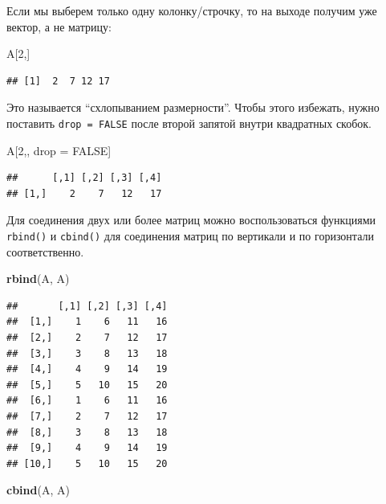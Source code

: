 \documentclass[
]{book}
\newenvironment{Shaded}{\begin{snugshade}}{\end{snugshade}}
\newcommand{\DecValTok}[1]{\textcolor[rgb]{0.00,0.00,0.81}{#1}}
\newcommand{\KeywordTok}[1]{\textcolor[rgb]{0.13,0.29,0.53}{\textbf{#1}}}
\newcommand{\NormalTok}[1]{#1}
\newcommand{\OtherTok}[1]{\textcolor[rgb]{0.56,0.35,0.01}{#1}}
\newcommand{\StringTok}[1]{\textcolor[rgb]{0.31,0.60,0.02}{#1}}
\begin{document}
Если мы выберем только одну колонку/строчку, то на выходе получим уже вектор, а не матрицу:

\begin{Shaded}
\begin{Highlighting}[]
\NormalTok{A[}\DecValTok{2}\NormalTok{,]}
\end{Highlighting}
\end{Shaded}

\begin{verbatim}
## [1]  2  7 12 17
\end{verbatim}

Это называется ``схлопыванием размерности''. Чтобы этого избежать, нужно поставить \texttt{drop\ =\ FALSE} после второй запятой внутри квадратных скобок.

\begin{Shaded}
\begin{Highlighting}[]
\NormalTok{A[}\DecValTok{2}\NormalTok{,, drop =}\StringTok{ }\OtherTok{FALSE}\NormalTok{]}
\end{Highlighting}
\end{Shaded}

\begin{verbatim}
##      [,1] [,2] [,3] [,4]
## [1,]    2    7   12   17
\end{verbatim}

Для соединения двух или более матриц можно воспользоваться функциями \texttt{rbind()} и \texttt{cbind()} для соединения матриц по вертикали и по горизонтали соответственно.

\begin{Shaded}
\begin{Highlighting}[]
\KeywordTok{rbind}\NormalTok{(A, A)}
\end{Highlighting}
\end{Shaded}

\begin{verbatim}
##       [,1] [,2] [,3] [,4]
##  [1,]    1    6   11   16
##  [2,]    2    7   12   17
##  [3,]    3    8   13   18
##  [4,]    4    9   14   19
##  [5,]    5   10   15   20
##  [6,]    1    6   11   16
##  [7,]    2    7   12   17
##  [8,]    3    8   13   18
##  [9,]    4    9   14   19
## [10,]    5   10   15   20
\end{verbatim}

\begin{Shaded}
\begin{Highlighting}[]
\KeywordTok{cbind}\NormalTok{(A, A)}
\end{Highlighting}
\end{Shaded}
\end{document}
